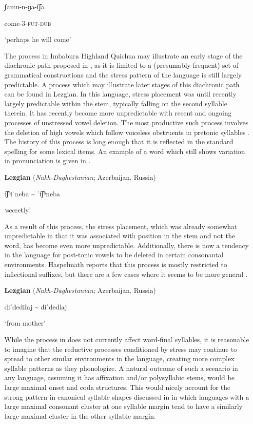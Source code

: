 ʃamu-n-ɡa-t͡ʃa

come-3-\textsc{fut-dub}

\glt ‘perhaps he will come’

\citep[209]{Cole1982}

\z

  The process in Imbabura Highland Quichua may illustrate an early stage of the diachronic path proposed in \citet{BybeeEtAl1998}, as it is limited to a (presumably frequent) set of grammatical constructions and the stress pattern of the language is still largely predictable. A process which may illustrate later stages of this diachronic path can be found in Lezgian. In this language, stress placement was until recently largely predictable within the stem, typically falling on the second syllable therein. It has recently become more unpredictable with recent and ongoing processes of unstressed vowel deletion. The most productive such process involves the deletion of high vowels which follow voiceless obstruents in pretonic syllables \citep[36]{Haspelmath1993}. The history of this process is long enough that it is reflected in the standard spelling for some lexical items. An example of a word which still shows variation in pronunciation is given in .

\ea\label{ex:(5.2)}
  \textbf{Lezgian} (\textit{Nakh-Daghestanian}; Azerbaijan, Russia)

t͡ʃʰiˈneba {\textasciitilde} ˈt͡ʃʰneba

\glt ‘secretly’

\citep[38]{Haspelmath1993}

\z

As a result of this process, the stress placement, which was already somewhat unpredictable in that it was associated with position in the stem and not the word, has become even more unpredictable. Additionally, there is now a tendency in the language for post-tonic vowels to be deleted in certain consonantal environments. Haspelmath reports that this process is mostly restricted to inflectional suffixes, but there are a few cases where it seems to be more general .

\ea\label{ex:(5.3)}
  \textbf{Lezgian} (\textit{Nakh-Daghestanian}; Azerbaijan, Russia)

diˈdedilaj {\textasciitilde} diˈdedlaj

\glt ‘from mother’

\citep[40]{Haspelmath1993}

\z

  While the process in  does not currently affect word-final syllables, it is reasonable to imagine that the reductive processes conditioned by stress may continue to spread to other similar environments in the language, creating more complex syllable patterns as they phonologize. A natural outcome of such a scenario in any language, assuming it has affixation and/or polysyllabic stems, would be large maximal onset and coda structures. This would nicely account for the strong pattern in canonical syllable shapes discussed in  in which languages with a large maximal consonant cluster at one syllable margin tend to have a similarly large maximal cluster in the other syllable margin.

